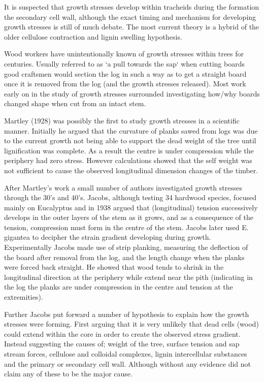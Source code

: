 \documentclass{article}
\begin{document}
It is suspected that growth stresses develop within tracheids during the
formation the secondary cell wall, although the exact timing and mechanism for
developing growth stresses is still of much debate. The most current theory is
a hybrid of the older cellulose contraction and lignin swelling hypothesis.

Wood workers have unintentionally known of growth stresses within trees
for centuries. Usually referred to as `a pull towards the sap` when cutting boards good
craftsmen would section the log in such a way as to get a straight board once it
is removed from the log (and the growth stresses released). Most work early on in
the study of growth stresses surrounded investigating how/why boards changed
shape when cut from an intact stem.

Martley (1928) was possibly the first to study growth stresses in a scientific
manner. Initially he argued that the curvature of planks sawed from logs was due
to the current growth not being able to support the dead weight of the tree until
lignification was complete. As a result the centre is under compression while
the periphery had zero stress. However calculations showed that the self weight
was not sufficient to cause the observed longitudinal dimension changes of the
timber.

After Martley's work a small number of authors investigated growth stresses
through the 30's and 40's. Jacobs, although testing 34 hardwood species, focused
mainly on Eucalyptus and in 1938 argued that (longitudinal) tension successively
develops in the outer layers of the stem as it grows, and as a consequence of
the tension, compression must form in the centre of the stem. Jacobs later used
E. gigantea to decipher the strain gradient developing during growth.
Experimentally Jacobs made use of strip planking, measuring the deflection of
the board after removal from the log, and the length change when the planks were
forced back straight. He showed that wood tends to shrink in the longitudinal
direction at the periphery while extend near the pith (indicating in the log
the planks are under compression in the centre and tension at the extremities).

Further Jacobs put forward a number of hypothesis to explain how the growth
stresses were forming. First arguing that it is very unlikely that dead cells
(wood) could extend within the core in order to create the observed stress
gradient. Instead suggesting the causes of; weight of the tree, surface tension
and sap stream forces, cellulose and colloidal complexes, lignin intercellular
substances and the primary or secondary cell wall. Although without any evidence
did not claim any of these to be the major cause.
\end{document}

